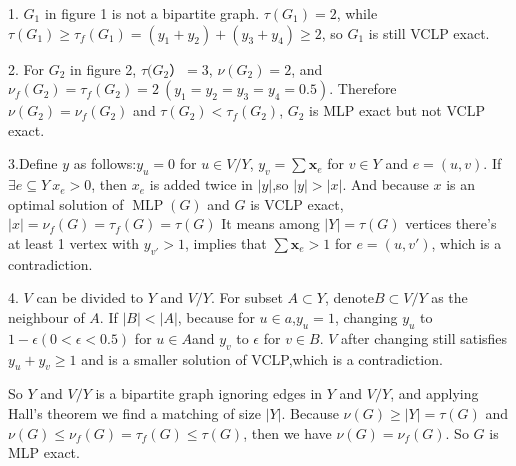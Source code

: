 \documentclass[11pt,a4paper,oneside]{article}
\newcommand{\x}{\mathbf{x}}
\begin{document}
\begin{problem}{4}
		1. $G_1$ in figure 1 is not a bipartite graph. $\tau(G_1)=2$, while $\tau(G_1)\geq \tau_{f}(G_1)=(y_1+y_2)+(y_3+y_4)\geq 2$, so $G_1$ is still VCLP exact.
		
		2. For $G_2$ in figure 2, $\tau(G_2）=3$,  $\nu(G_2)=2$, and $\nu_{f}(G_2)=\tau_{f}(G_2)=2\ (y_1=y_2=y_3=y_4=0.5)$. 
		Therefore $\nu(G_2)=\nu_f(G_2)$ and $\tau(G_2)<\tau_f(G_2)$, $G_2$ is MLP exact but not VCLP exact.
		
		3.Define $y$ as follows:$y_u=0$ for $u\in V/Y$, $y_v=\sum\x_e$ for $v\in Y$ and $e=(u,v)$.
		If $\exists e\subseteq Y\ x_e>0$, then $x_e$ is added twice in $|y|$,so $|y|>|x|$.
		And because $x$ is an optimal solution of $\operatorname{MLP}(G)$ and $G$ is VCLP exact, $|x|=\nu_{f}(G)=\tau_{f}(G)=\tau(G)$
		It means among $|Y|=\tau(G)$ vertices there's at least 1 vertex with $y_{v'}>1$, implies that $\sum\x_e>1$ for $e=(u,v')$, which is a contradiction.
		
		4. $V$ can be divided to $Y$ and $V/Y$. 
		For subset $A\subset Y$, denote$B\subset V/Y$ as the neighbour of $A$.
		If $|B|<|A|$, because for $u\in a$,$y_u=1$, changing $y_u$ to $1-\epsilon(0<\epsilon<0.5)$ for $u\in A$and $y_v$ to $\epsilon$ for $v\in B$. $V$ after changing still satisfies $y_u+y_v\geq 1$ and is a smaller solution of VCLP,which is a contradiction.
		 
		So $Y$ and $V/Y$ is a bipartite graph ignoring edges in $Y$ and $V/Y$, and applying Hall's theorem we find a matching of size $|Y|$. 
		Because $\nu(G)\geq|Y|=\tau(G)$ and $\nu(G) \leq \nu_{f}(G)=\tau_{f}(G) \leq \tau(G)$, then we have $\nu(G)=\nu_f(G)$. 
		So $G$ is MLP exact.
		 
	
\end{problem}
\end{document}
